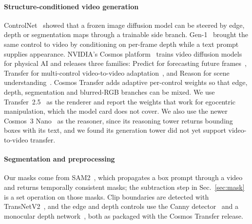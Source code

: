 \paragraph{Structure-conditioned video generation}
ControlNet~\cite{controlnet} showed that a frozen image diffusion model can be steered by edge, depth or segmentation maps through a trainable side branch. Gen-1~\cite{gen1} brought the same control to video by conditioning on per-frame depth while a text prompt supplies appearance. NVIDIA's Cosmos platform~\cite{cosmos2025} trains video diffusion models for physical AI and releases three families: Predict for forecasting future frames~\cite{cosmospredict2}, Transfer for multi-control video-to-video adaptation~\cite{cosmostransfer1}, and Reason for scene understanding~\cite{cosmosreason1}. Cosmos Transfer adds adaptive per-control weights so that edge, depth, segmentation and blurred-RGB branches can be mixed. We use Transfer~2.5~\cite{cosmos25,cosmostransfer25} as the renderer and report the weights that work for egocentric manipulation, which the model card does not cover. We also use the newer Cosmos~3 Nano~\cite{cosmos3,cosmos3nano} as the reasoner, since its reasoning tower returns bounding boxes with its text, and we found its generation tower did not yet support video-to-video transfer.

\paragraph{Segmentation and preprocessing}
Our masks come from SAM2~\cite{sam2}, which propagates a box prompt through a video and returns temporally consistent masks; the subtraction step in Sec.~\ref{sec:mask} is a set operation on those masks. Clip boundaries are detected with TransNetV2~\cite{transnetv2}, and the edge and depth controls use the Canny detector~\cite{canny1986} and a monocular depth network~\cite{depthanything}, both as packaged with the Cosmos Transfer release.
